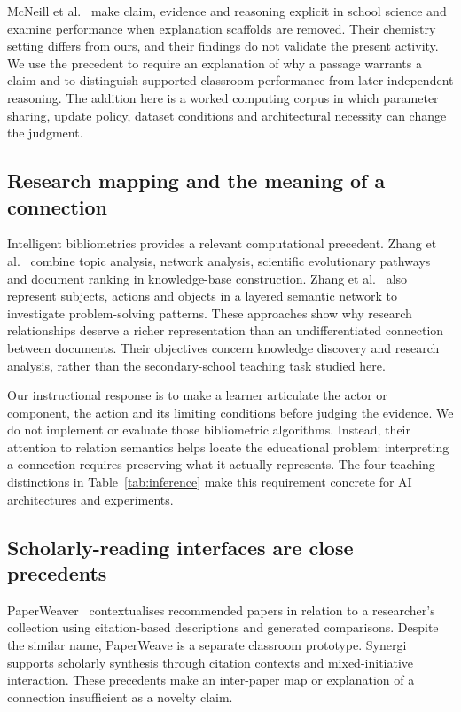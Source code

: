 McNeill et al.~\cite{mcneill} make claim, evidence and reasoning explicit in school science and examine performance when explanation scaffolds are removed. Their chemistry setting differs from ours, and their findings do not validate the present activity. We use the precedent to require an explanation of why a passage warrants a claim and to distinguish supported classroom performance from later independent reasoning. The addition here is a worked computing corpus in which parameter sharing, update policy, dataset conditions and architectural necessity can change the judgment.

\subsection{Research mapping and the meaning of a connection}
Intelligent bibliometrics provides a relevant computational precedent. Zhang et al.~\cite{zhangkbc} combine topic analysis, network analysis, scientific evolutionary pathways and document ranking in knowledge-base construction. Zhang et al.~\cite{zhangsao} also represent subjects, actions and objects in a layered semantic network to investigate problem-solving patterns. These approaches show why research relationships deserve a richer representation than an undifferentiated connection between documents. Their objectives concern knowledge discovery and research analysis, rather than the secondary-school teaching task studied here.

Our instructional response is to make a learner articulate the actor or component, the action and its limiting conditions before judging the evidence. We do not implement or evaluate those bibliometric algorithms. Instead, their attention to relation semantics helps locate the educational problem: interpreting a connection requires preserving what it actually represents. The four teaching distinctions in Table~\ref{tab:inference} make this requirement concrete for AI architectures and experiments.

\subsection{Scholarly-reading interfaces are close precedents}
PaperWeaver~\cite{paperweaver} contextualises recommended papers in relation to a researcher's collection using citation-based descriptions and generated comparisons. Despite the similar name, PaperWeave is a separate classroom prototype. Synergi~\cite{synergi} supports scholarly synthesis through citation contexts and mixed-initiative interaction. These precedents make an inter-paper map or explanation of a connection insufficient as a novelty claim.

